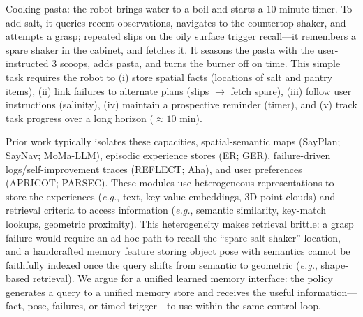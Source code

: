Cooking pasta: the robot brings water to a boil and starts a $10$-minute timer. To add salt, it queries recent observations, navigates to the countertop shaker, and attempts a grasp; repeated slips on the oily surface trigger recall---it remembers a spare shaker in the cabinet, and fetches it. It seasons the pasta with the user-instructed $3$ scoops, adds pasta, and turns the burner off on time. This simple task requires the robot to (i) store spatial facts (locations of salt and pantry items), (ii) link failures to alternate plans (slips $\rightarrow$ fetch spare), (iii) follow user instructions (salinity), (iv) maintain a prospective reminder (timer), and (v) track task progress over a long horizon ($\approx 10$ min).

Prior work typically isolates these capacities, spatial-semantic maps (SayPlan; SayNav; MoMa-LLM), episodic experience stores (ER; GER), failure-driven logs/self-improvement traces (REFLECT; Aha), and user preferences (APRICOT; PARSEC). These modules use heterogeneous representations to store the experiences (\textit{e.g.}, text, key-value embeddings, 3D point clouds) and retrieval criteria to access information (\textit{e.g.}, semantic similarity, key-match lookups, geometric proximity). 
This heterogeneity makes retrieval brittle: a grasp failure would require an ad hoc path to recall the ``spare salt shaker'' location, and a handcrafted memory feature storing object pose with semantics cannot be faithfully indexed once the query shifts from semantic to geometric (\textit{e.g.}, shape-based retrieval).
We argue for a unified learned memory interface: the policy generates a query to a unified memory store and receives the useful information---fact, pose, failures, or timed trigger---to use within the same control loop.

